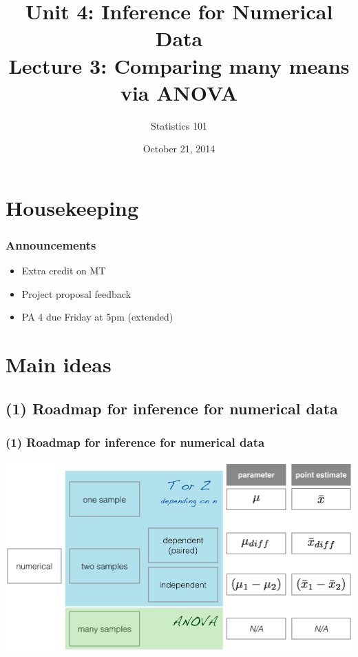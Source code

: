 \documentclass[slidestop,compress,mathserif]{beamer}
\title[U4 - L3: ANOVA]{Unit 4: Inference for Numerical Data \\ Lecture 3: Comparing many means via ANOVA}
\author{Statistics 101}
\date{October 21, 2014}
\institute{Mine \c{C}etinkaya-Rundel}
\begin{document}


\begin{frame}[plain]

\titlepage

\end{frame}


\section{Housekeeping}


\begin{frame}
\frametitle{Announcements}

\begin{itemize}

\item Extra credit on MT

\item Project proposal feedback

\item PA 4 due Friday at 5pm (extended)

\end{itemize}

\end{frame}


\section{Main ideas}


\subsection{(1) Roadmap for inference for numerical data}


\begin{frame}
\frametitle{(1) Roadmap for inference for numerical data}

\begin{center}
\includegraphics[width=\textwidth]{figures/num_data_inf/num_data_inf}
\end{center}

\end{frame}
\end{document}
